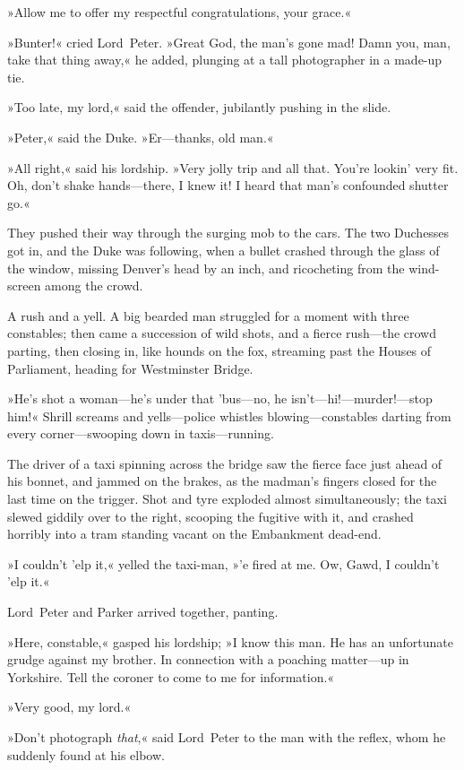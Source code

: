 »Allow me to offer my respectful congratulations, your grace.«

»Bunter!« cried Lord~Peter. »Great God, the man's gone mad! Damn you, man, take that thing away,« he added, plunging at a tall photographer in a made-up tie.

»Too late, my lord,« said the offender, jubilantly pushing in the slide.

»Peter,« said the Duke. »Er—thanks, old man.«

»All right,« said his lordship. »Very jolly trip and all that. You're lookin' very fit. Oh, don't shake hands—there, I knew it! I heard that man's confounded shutter go.«

They pushed their way through the surging mob to the cars. The two Duchesses got in, and the Duke was following, when a bullet crashed through the glass of the window, missing Denver's head by an inch, and ricocheting from the wind-screen among the crowd.

A rush and a yell. A big bearded man struggled for a moment with three constables; then came a succession of wild shots, and a fierce rush—the crowd parting, then closing in, like hounds on the fox, streaming past the Houses of Parliament, heading for Westminster Bridge.

»He's shot a woman—he's under that 'bus—no, he isn't—hi!—murder!\allowbreak—stop him!« Shrill screams and yells—police whistles blowing—constables darting from every corner—swooping down in taxis—running.

The driver of a taxi spinning across the bridge saw the fierce face just ahead of his bonnet, and jammed on the brakes, as the madman's fingers closed for the last time on the trigger. Shot and tyre exploded almost simultaneously; the taxi slewed giddily over to the right, scooping the fugitive with it, and crashed horribly into a tram standing vacant on the Embankment dead-end.

»I couldn't 'elp it,« yelled the taxi-man, »'e fired at me. Ow, Gawd, I couldn't 'elp it.«

Lord~Peter and Parker arrived together, panting.

»Here, constable,« gasped his lordship; »I know this man. He has an unfortunate grudge against my brother. In connection with a poaching matter—up in Yorkshire. Tell the coroner to come to me for information.«

»Very good, my lord.«

»Don't photograph \textit{that},« said Lord~Peter to the man with the reflex, whom he suddenly found at his elbow.

